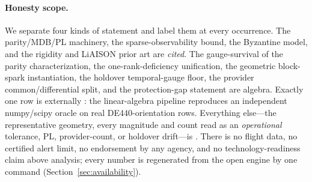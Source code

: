 \paragraph{Honesty scope.}
We separate four kinds of statement and label them at every occurrence. The parity/MDB/PL
machinery, the sparse-observability bound, the Byzantine model, and the rigidity and LiAISON
prior art are \emph{cited}. The gauge-survival of the parity characterization, the
one-rank-deficiency unification, the geometric block-spark instantiation, the holdover
temporal-gauge floor, the provider common/differential split, and the protection-gap
statement are \Proven{} algebra. Exactly one row is externally \Validated{}: the
linear-algebra pipeline reproduces an independent numpy/scipy oracle on real
DE440-orientation rows. Everything else---the representative geometry, every magnitude and
count read as an \emph{operational} tolerance, PL, provider-count, or holdover drift---is
\Modelled{}. There is no flight data, no certified alert limit, no endorsement by any agency,
and no technology-readiness claim above analysis; every number is regenerated from the open
engine by one command (Section~\ref{sec:availability}).
